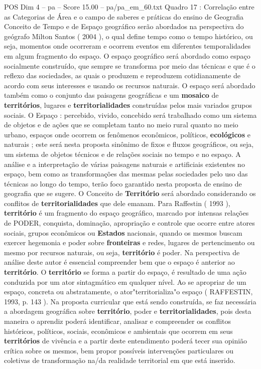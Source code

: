 \begin{textsample}{POS Dim 4 – pa – Score 15.00 – pa/pa\_em\_60.txt}  \label{ex:f4_pos_007}
Quadro 17 : Correlação entre as Categorias de Área e o campo de saberes e práticas do ensino de Geografia Conceito de Tempo e de Espaço geográfico serão abordados na perspectiva do geógrafo Milton Santos ( 2004 ), o qual define tempo como o tempo histórico, ou seja, momentos onde ocorreram e ocorrem eventos em diferentes temporalidades em algum fragmento do espaço.
O espaço geográfico será abordado como espaço socialmente construído, que sempre se transforma por meio das técnicas e que é o reflexo das sociedades, as quais o produzem e reproduzem cotidianamente de acordo com seus interesses e usando os recursos naturais.
O espaço será abordado também como o conjunto das paisagens geográficas e um \textbf{mosaico} de \textbf{territórios}, lugares e \textbf{territorialidades} construídas pelos mais variados grupos sociais.
O Espaço : percebido, vivido, concebido será trabalhado como um sistema de objetos e de ações que se completam tanto no meio rural quanto no meio urbano, espaços onde ocorrem os fenômenos econômicos, políticos, \textbf{ecológicos} e naturais ; este será nesta proposta sinônimo de fixos e fluxos geográficos, ou seja, um sistema de objetos técnicos e de relações sociais no tempo e no espaço.
A análise e a interpretação de várias paisagens naturais e artificiais existentes no espaço, bem como as transformações das mesmas pelas sociedades pelo uso das técnicas ao longo do tempo, terão foco garantido nesta proposta de ensino de geografia que se sugere.
O Conceito de \textbf{Território} será abordado considerando os conflitos de \textbf{territorialidades} que dele emanam.
Para Raffestin ( 1993 ), \textbf{território} é um fragmento do espaço geográfico, marcado por intensas relações de PODER, conquista, dominação, apropriação e controle que ocorre entre atores sociais, grupos econômicos ou \textbf{Estados} nacionais, quando os mesmos buscam exercer hegemonia e poder sobre \textbf{fronteiras} e redes, lugares de pertencimento ou mesmo por recursos naturais, ou seja, \textbf{território} é poder.
Na perspectiva de análise deste autor é essencial compreender bem que o espaço é anterior ao \textbf{território}.
O \textbf{território} se forma a partir do espaço, é resultado de uma ação conduzida por um ator sintagmático em qualquer nível.
Ao se apropriar de um espaço, concreta ou abstratamente, o ator"territorializa"o espaço ( RAFFESTIN, 1993, p. 143 ).
Na proposta curricular que está sendo construída, se faz necessária a abordagem geográfica sobre \textbf{território}, poder e \textbf{territorialidades}, pois desta maneira o aprendiz poderá identificar, analisar e compreender os conflitos históricos, políticos, sociais, econômicos e ambientais que ocorrem em seus \textbf{territórios} de vivência e a partir deste entendimento poderá tecer sua opinião crítica sobre os mesmos, bem propor possíveis intervenções particulares ou coletivas de transformação na/da realidade territorial em que está inserido.

\end{textsample}
